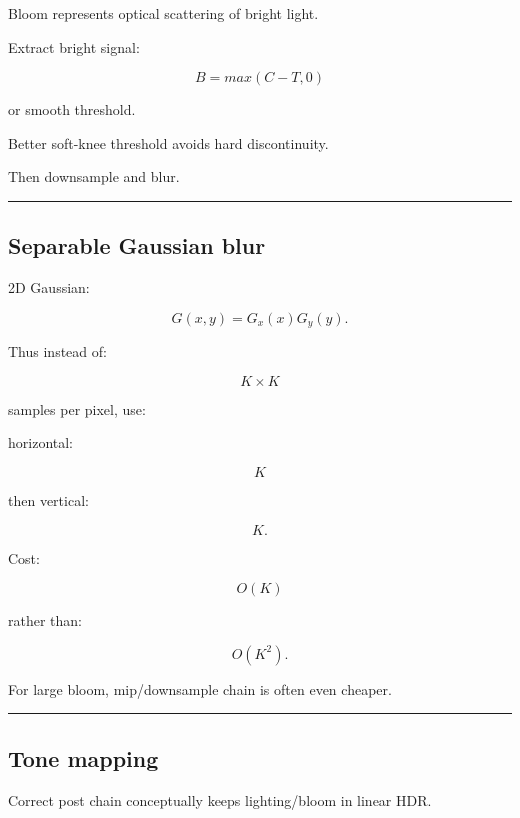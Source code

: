 \hypertarget{04-visual-computing-ii-ch040-bloom}{}

Bloom represents optical scattering of bright light.

Extract bright signal:

\[
B=
max(
C-T,
0
)
\]

or smooth threshold.

Better soft-knee threshold avoids hard discontinuity.

Then downsample and blur.

\begin{center}\rule{0.5\linewidth}{0.5pt}\end{center}

\subsection{Separable Gaussian blur}\label{04-visual-computing-ii-ch040-separable-gaussian-blur}

\hypertarget{04-visual-computing-ii-ch040-separable-gaussian-blur}{}

2D Gaussian:

\[
G(x,y)
=
G_x(x)G_y(y).
\]

Thus instead of:

\[
K\times K
\]

samples per pixel, use:

horizontal:

\[
K
\]

then vertical:

\[
K.
\]

Cost:

\[
O(K)
\]

rather than:

\[
O(K^2).
\]

For large bloom, mip/downsample chain is often even cheaper.

\begin{center}\rule{0.5\linewidth}{0.5pt}\end{center}

\subsection{Tone mapping}\label{04-visual-computing-ii-ch040-tone-mapping}

\hypertarget{04-visual-computing-ii-ch040-tone-mapping}{}

Correct post chain conceptually keeps lighting/bloom in linear HDR.

